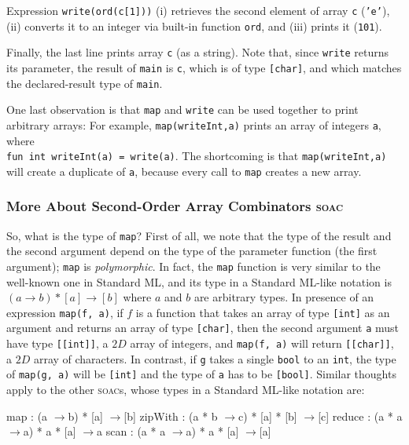 \documentclass[a4paper,11pt]{article}
\newcommand{\fasto}{\textsc{Fasto}\xspace}
\begin{document}
Expression {\tt write(ord(c[1]))} (i) retrieves the second element of array {\tt c}
({\tt 'e'}), (ii) converts it to an integer via built-in function {\tt ord},
and (iii) prints it ({\tt 101}).

Finally,  the last line prints array {\tt c} (as a string). 
Note that, since {\tt write} returns its parameter,
the result of {\tt main} is {\tt c}, which is of type {\tt [char]},
and which matches the declared-result type of {\tt main}.

One last observation is that {\tt map} and {\tt write} can be used together to 
print arbitrary arrays: For example, \texttt{map(writeInt,a)} prints an array 
of integers {\tt a}, where \\ {\tt fun int writeInt(a) = write(a)}. 
The shortcoming is that \texttt{map(writeInt,a)} will create a duplicate of {\tt a}, 
because every call to {\tt map} creates a new array. 
%




\subsubsection{More About Second-Order Array Combinators \textsc{soac}}
\label{subsec:hof-implem}

So, what is the type of {\tt map}?
%
First of all, we note that the type of the result and the second argument 
depend on the type of the parameter function (the first argument); 
\texttt{map} is \emph{polymorphic}.
In fact, the {\tt map} function is very similar to the well-known one in 
Standard ML, and its type in a Standard ML-like notation is 
$ (a\rightarrow b) * [a] \rightarrow [b]$ where $a$ and $b$ are arbitrary types.
In presence of an expression \texttt{map(f, a)},
if $f$ is a function  that takes an array of type {\tt [int]} as an argument and
returns an array of type {\tt [char]}, then the second argument \texttt{a}
must have type \texttt{[[int]]}, a $2D$ array of integers, and
{\tt map(f, a)} will return {\tt [[char]]}, a $2D$  array of characters.
In contrast, if \texttt{g} takes a single \texttt{bool} to an \texttt{int},
the type of \texttt{map(g, a)} will be \texttt{[int]} and the type of \texttt{a}
has to be \texttt{[bool]}.
%
Similar thoughts apply to the other \textsc{soac}s, whose types in a
Standard ML-like notation are:

\vspace*{-2ex}
\newcommand{\maps}{$\rightarrow$}
\begin{fancycode}[frame=lines,
  label=\textit{\scriptsize \textsc{soac} types in \fasto{}, SML-like notation}]
map     : (a \maps b) * [a] \maps [b]
zipWith : (a * b \maps c) * [a] * [b] \maps [c]
reduce  : (a * a \maps a) * a * [a] \maps a
scan    : (a * a \maps a) * a * [a] \maps [a]
\end{fancycode}
\end{document}
